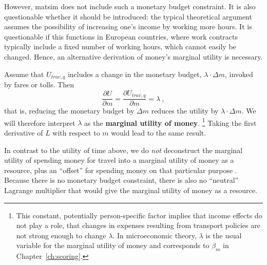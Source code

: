 However, \acrshort{matsim} does not include such a monetary budget constraint. It is also questionable whether it should be introduced: the typical theoretical argument assumes the possibility of increasing one's income by working more hours. It is questionable if this functions in European countries, where work contracts typically include a fixed number of working hours, which cannot easily be changed.  
%
Hence, an alternative derivation of money's marginal utility is necessary.

Assume that $U_{trav,q}$ includes a change in the monetary budget, $\lambda \cdot \Delta m$, \eg invoked by fares or tolls.  Then
\begin{equation}
%
\frac{\partial U}{\partial m} 
%
= \frac{\partial U_{trav,q}}{\partial m}
%
= \lambda \ ,
\label{eq:marg-utl-of-money}
\end{equation}
that is, reducing the monetary budget by $\Delta m$ reduces the utility by $ \lambda \cdot \Delta m$.
%
We will therefore interpret $\lambda$ as the \textbf{marginal utility of money}.%
%
\footnote{\label{footnote:income-effects}
%
This constant, potentially person-specific factor implies that income effects \citep{HerrigesKling1999Nonlinearincomeeffects,DalyEtAl2008WelfareMeasuresIncome, DagsvikKarlstrom2005ChoiceProbabilitiesInNonlinearRUM,Jara-Diaz1989IncomeEffectsInModeChoice} do not play a role, \ie that changes in expenses resulting from transport policies are not strong enough to change $\lambda$. In microeconomic theory, $\lambda$ is the usual variable for the marginal utility of money and corresponds to $\beta_{m}$ in Chapter~\ref{ch:scoring}.
%
}
%
Taking the first derivative of $L$ with respect to $m$ would lead to the same result.

In contrast to the utility of time above, we do \emph{not} deconstruct the  marginal utility of spending money for travel into a marginal utility of money as a resource, plus an ``offset'' for spending money on that particular purpose \citep[for an example of this decomposition, see, e.g.][]{MunizagaEtAl2012TimeAllocationModeChoice}.  Because there is no monetary budget constraint, there is also no ``neutral'' Lagrange multiplier that would give the marginal utility of money as a resource.

